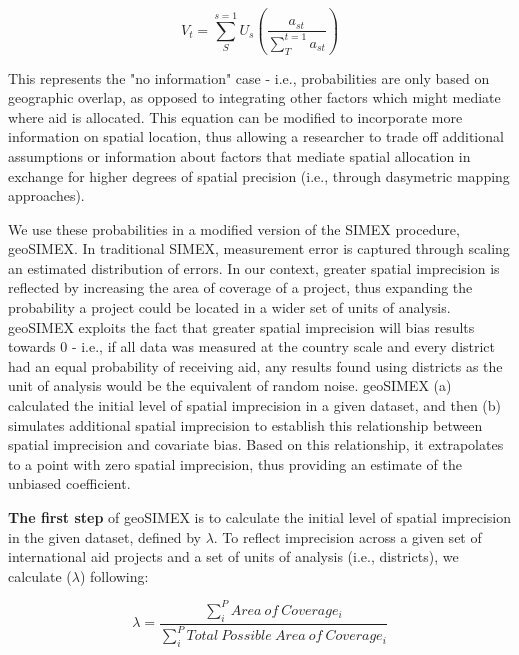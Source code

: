 \begin{equation}\label{eq:overlaps}
V_{t} = \sum_{S}^{s=1}U_{s}\left ( \frac{a_{st}}{\sum_{T}^{t=1}a_{st}} \right )
\end{equation}

\noindent This represents the "no information" case - i.e., probabilities are only based on geographic overlap, as opposed to integrating other factors which might mediate where aid is allocated.
This equation can be modified to incorporate more information on spatial location, thus allowing a researcher to trade off additional assumptions or information about factors that mediate spatial allocation in exchange for higher degrees of spatial precision (i.e., through dasymetric mapping approaches).
\par
We use these probabilities in a modified version of the SIMEX procedure, geoSIMEX.  
In traditional SIMEX, measurement error is captured through scaling an estimated distribution of errors.
In our context, greater spatial imprecision is reflected by increasing the area of coverage of a project, thus expanding the probability a project could be located in a wider set of units of analysis. 
geoSIMEX exploits the fact that greater spatial imprecision will bias results towards 0 - i.e., if all data was measured at the country scale and every district had an equal probability of receiving aid, any results found using districts as the unit of analysis would be the equivalent of random noise.
geoSIMEX (a) calculated the initial level of spatial imprecision in a given dataset, and then (b) simulates additional spatial imprecision to establish this relationship between spatial imprecision and covariate bias. 
Based on this relationship, it extrapolates to a point with zero spatial imprecision, thus providing an estimate of the unbiased coefficient.
\par

\textbf{The first step} of geoSIMEX is to calculate the initial level of spatial imprecision in the given dataset, defined by $\lambda$.
To reflect imprecision across a given set of international aid projects and a set of units of analysis (i.e., districts), we calculate (\begin{math}\lambda\end{math}) following:

\begin{equation}\label{lambda}
\lambda = \frac{\sum_{i}^{P}Area \ of \ Coverage_i}{\sum_{i}^{P}Total \ Possible \ Area \ of \ Coverage_i}
\end{equation}

